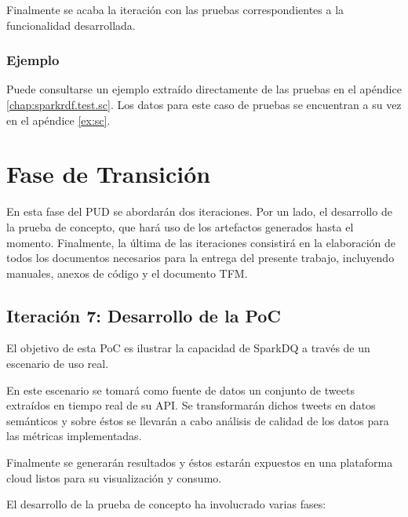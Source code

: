 Finalmente se acaba la iteración con las pruebas correspondientes a la
funcionalidad desarrollada. 

\subsubsection{Ejemplo}

Puede consultarse un ejemplo extraído directamente de las pruebas en el
apéndice \ref{chap:sparkrdf.test.sc}. Los datos para este caso de pruebas se encuentran a su vez en
el apéndice \ref{ex:sc}.

\section{Fase de Transición}

En esta fase del \acs{PUD} se abordarán dos iteraciones. Por un lado, el
desarrollo de la prueba de concepto, que hará uso de los artefactos generados
hasta el momento. Finalmente, la última de las iteraciones consistirá en la
elaboración de todos los documentos necesarios para la entrega del presente
trabajo, incluyendo manuales, anexos de código y el documento \acs{TFM}. 

\subsection{Iteración 7: Desarrollo de la \acs{PoC}}



El objetivo de esta \acs{PoC} es ilustrar la capacidad de SparkDQ a través de un
escenario de uso real. 

En este escenario se tomará como fuente de datos un
conjunto de tweets extraídos en tiempo real de su API. Se transformarán dichos
tweets en datos semánticos y sobre éstos se llevarán a cabo análisis de calidad
de los datos para las métricas implementadas. 

Finalmente se generarán resultados y éstos estarán expuestos en una plataforma
cloud listos para su visualización y consumo. 


El desarrollo de la prueba de concepto ha involucrado varias fases: 

